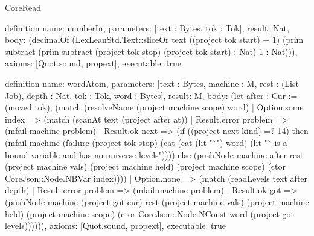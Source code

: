 \begin{lexlean}{CoreRead}
\begin{semanticmodule}
definition{
  name: numberIn,
  parameters: [text : Bytes, tok : Tok],
  result: Nat,
  body: (decimalOf (LexLeanStd.Text::sliceOr text ((project tok start) + 1) (prim subtract (prim subtract (project tok stop) (project tok start) : Nat) 1 : Nat))),
  axioms: [Quot.sound, propext],
  executable: true
}

definition{
  name: wordAtom,
  parameters: [text : Bytes, machine : M, rest : (List Job), depth : Nat, tok : Tok, word : Bytes],
  result: M,
  body: (let after : Cur := (moved tok); (match (resolveName (project machine scope) word)
    | Option.some index => (match (scanAt text (project after at))
      | Result.error problem => (mfail machine problem)
      | Result.ok next => (if ((project next kind) =? 14) then (mfail machine (failure (project tok stop) (cat (cat (lit "`") word) (lit "` is a bound variable and has no universe levels")))) else (pushNode machine after rest (project machine vals) (project machine held) (project machine scope) (ctor CoreJson::Node.NBVar index))))
    | Option.none => (match (readLevels text after depth)
      | Result.error problem => (mfail machine problem)
      | Result.ok got => (pushNode machine (project got cur) rest (project machine vals) (project machine held) (project machine scope) (ctor CoreJson::Node.NConst word (project got levels)))))),
  axioms: [Quot.sound, propext],
  executable: true
}


\end{semanticmodule}
\end{lexlean}
